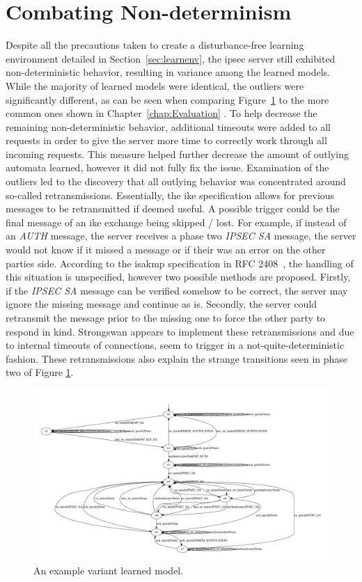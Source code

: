 \section{Combating Non-determinism} \label{sec:nondet}
Despite all the precautions taken to create a disturbance-free learning environment detailed in Section~\ref{sec:learnenv}, the \ac{ipsec} server still exhibited non-deterministic behavior, resulting in variance among the learned models. While the majority of learned models were identical, the outliers were significantly different, as can be seen when comparing Figure~\ref{fig:nofilterb} to the more common ones shown in Chapter~\ref{chap:Evaluation} . To help decrease the remaining non-deterministic behavior, additional timeouts were added to all requests in order to give the server more time to correctly work through all incoming requests. This measure helped further decrease the amount of outlying automata learned, however it did not fully fix the issue. Examination of the outliers led to the discovery that all outlying behavior was concentrated around so-called retransmissions. Essentially, the \ac{ike} specification allows for previous messages to be retransmitted if deemed useful. A possible trigger could be the final message of an \ac{ike} exchange being skipped / lost. For example, if instead of an \emph{AUTH} message, the server receives a phase two \emph{IPSEC SA} message, the server would not know if it missed a message or if their was an error on the other parties side. According to the \ac{isakmp} specification in RFC 2408~\cite{rfc:isakmp}, the handling of this situation is unspecified, however two possible methods are proposed. Firstly, if the \emph{IPSEC SA} message can be verified somehow to be correct, the server may ignore the missing message and continue as is. Secondly, the server could retransmit the message prior to the missing one to force the other party to respond in kind. Strongswan appears to implement these retransmissions and due to internal timeouts of connections, seem to trigger in a not-quite-deterministic fashion. These retransmissions also explain the strange transitions seen in phase two of Figure \ref{fig:nofilterb}. 

\begin{figure}[h]
	\centering
	\includegraphics[width=0.7\linewidth]{images/models/NoFilterB}
	\caption{An example variant learned model.}
	\label{fig:nofilterb}
\end{figure}


